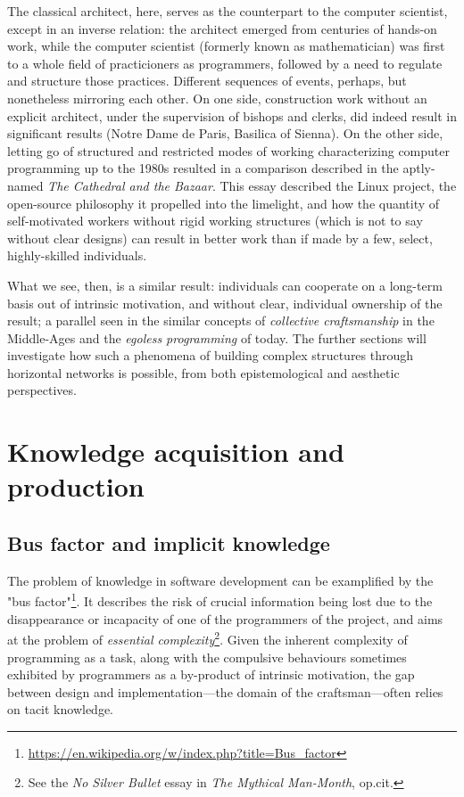 \documentclass{article}
\begin{document}
The classical architect, here, serves as the counterpart to the computer scientist, except in an inverse relation: the architect emerged from centuries of hands-on work, while the computer scientist (formerly known as mathematician) was first to a whole field of practicioners as programmers, followed by a need to regulate and structure those practices. Different sequences of events, perhaps, but nonetheless mirroring each other. On one side, construction work without an explicit architect, under the supervision of bishops and clerks, did indeed result in significant results (Notre Dame de Paris, Basilica of Sienna). On the other side, letting go of structured and restricted modes of working characterizing computer programming up to the 1980s resulted in a comparison described in the aptly-named \textit{The Cathedral and the Bazaar}. This essay described the Linux project, the open-source philosophy it propelled into the limelight, and how the quantity of self-motivated workers without rigid working structures (which is not to say without clear designs) can result in better work than if made by a few, select, highly-skilled individuals\cite{raymond_cathedral_2001,henningsen_joys_2020}.

What we see, then, is a similar result: individuals can cooperate on a long-term basis out of intrinsic motivation, and without clear, individual ownership of the result; a parallel seen in the similar concepts of \textit{collective craftsmanship} in the Middle-Ages and the \emph{egoless programming} of today\cite{brooks_mythical_1975}. The further sections will investigate how such a phenomena of building complex structures through horizontal networks is possible, from both epistemological and aesthetic perspectives.

\section{Knowledge acquisition and production}

\subsection{Bus factor and implicit knowledge}

The problem of knowledge in software development can be examplified by the "bus factor"\footnote{\url{https://en.wikipedia.org/w/index.php?title=Bus_factor}}. It describes the risk of crucial information being lost due to the disappearance or incapacity of one of the programmers of the project, and aims at the problem of \emph{essential complexity}\footnote{See the \textit{No Silver Bullet} essay in \emph{The Mythical Man-Month}, op.cit.}. Given the inherent complexity of programming as a task, along with the compulsive behaviours sometimes exhibited by programmers as a by-product of intrinsic motivation\cite{weizenbaum_computer_1976}, the gap between design and implementation---the domain of the craftsman---often relies on tacit knowledge\cite{collins_tacit_2010}.
\end{document}
